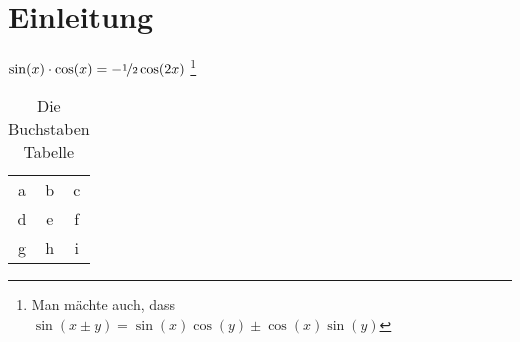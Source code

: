 
\chapter{Einleitung}

\blindtext

$\sin(x)\cdot\cos(x) = -\nicefrac{1}{2} \cos(2x)$
\footnote{Man mächte auch, dass $\sin(x\pm y) = \sin(x)\cos(y) \pm \cos(x)\sin(y)$ }    %

\begin{table}[h]
  \centering
  \begin{tabular}{ccc}
    \toprule
    a & b & c\\
    d & e & f\\
    g & h & i\\
    \bottomrule
  \end{tabular}
  \caption{Die Buchstaben Tabelle}		
  \label{tab:buchstabentable}		%
\end{table}	